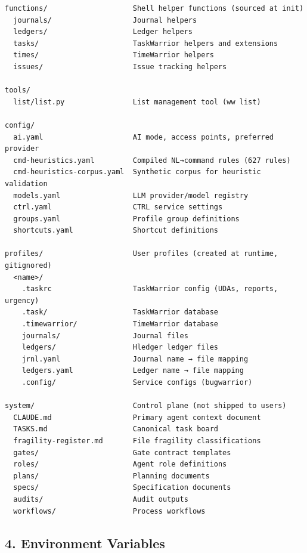\documentclass[11pt, a4paper, DIV=14]{scrartcl}
\let\origRule\rule
\renewcommand{\rule}[2]{\par\noindent{\color{BabbBorder}\origRule{#1}{#2}}\par}
\begin{document}
\begin{verbatim}
functions/                    Shell helper functions (sourced at init)
  journals/                   Journal helpers
  ledgers/                    Ledger helpers
  tasks/                      TaskWarrior helpers and extensions
  times/                      TimeWarrior helpers
  issues/                     Issue tracking helpers

tools/
  list/list.py                List management tool (ww list)

config/
  ai.yaml                     AI mode, access points, preferred provider
  cmd-heuristics.yaml         Compiled NL→command rules (627 rules)
  cmd-heuristics-corpus.yaml  Synthetic corpus for heuristic validation
  models.yaml                 LLM provider/model registry
  ctrl.yaml                   CTRL service settings
  groups.yaml                 Profile group definitions
  shortcuts.yaml              Shortcut definitions

profiles/                     User profiles (created at runtime, gitignored)
  <name>/
    .taskrc                   TaskWarrior config (UDAs, reports, urgency)
    .task/                    TaskWarrior database
    .timewarrior/             TimeWarrior database
    journals/                 Journal files
    ledgers/                  Hledger ledger files
    jrnl.yaml                 Journal name → file mapping
    ledgers.yaml              Ledger name → file mapping
    .config/                  Service configs (bugwarrior)

system/                       Control plane (not shipped to users)
  CLAUDE.md                   Primary agent context document
  TASKS.md                    Canonical task board
  fragility-register.md       File fragility classifications
  gates/                      Gate contract templates
  roles/                      Agent role definitions
  plans/                      Planning documents
  specs/                      Specification documents
  audits/                     Audit outputs
  workflows/                  Process workflows
\end{verbatim}

\begin{center}\rule{0.5\linewidth}{0.5pt}\end{center}

\subsection{4. Environment Variables}\label{environment-variables}
\end{document}
